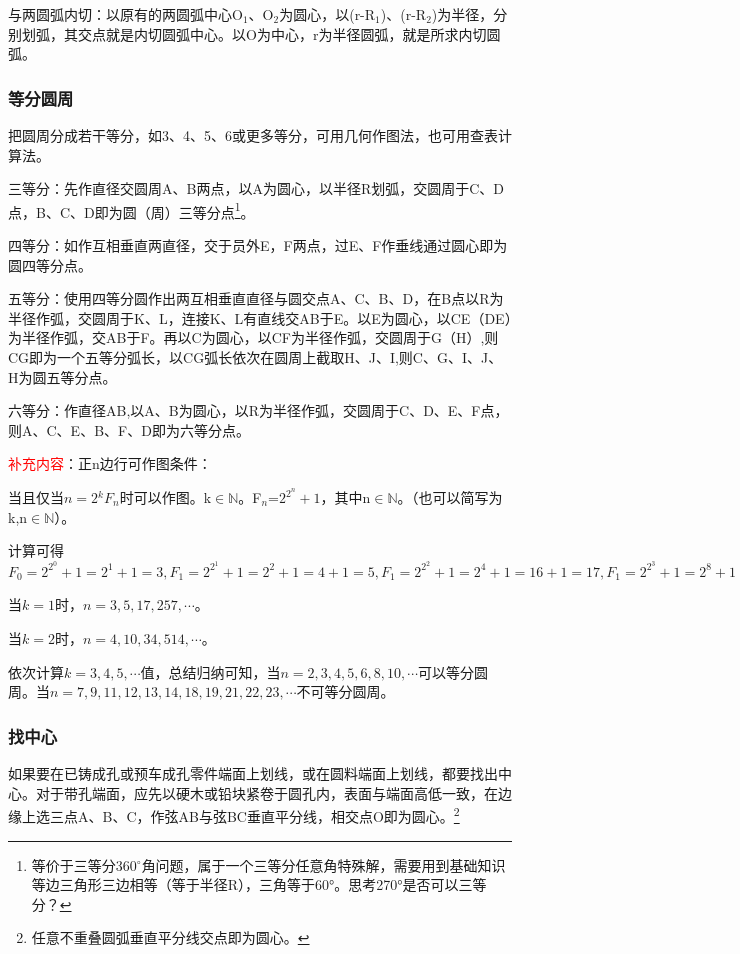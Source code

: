 \documentclass{ctexbook}
\begin{document}
与两圆弧内切：以原有的两圆弧中心O$_1$、O$_{2}$为圆心，以(r-R$_1$)、(r-R$_2$)为半径，分别划弧，其交点就是内切圆弧中心。以O为中心，r为半径圆弧，就是所求内切圆弧。
\subsubsection{等分圆周}
把圆周分成若干等分，如3、4、5、6或更多等分，可用几何作图法，也可用查表计算法。

三等分：先作直径交圆周A、B两点，以A为圆心，以半径R划弧，交圆周于C、D点，B、C、D即为圆（周）三等分点\footnote{等价于三等分360$^{\circ}$角问题，属于一个三等分任意角特殊解，需要用到基础知识等边三角形三边相等（等于半径R），三角等于60°。思考270°是否可以三等分？}。

四等分：如作互相垂直两直径，交于员外E，F两点，过E、F作垂线通过圆心即为圆四等分点。

五等分：使用四等分圆作出两互相垂直直径与圆交点A、C、B、D，在B点以R为半径作弧，交圆周于K、L，连接K、L有直线交AB于E。以E为圆心，以CE（DE）为半径作弧，交AB于F。再以C为圆心，以CF为半径作弧，交圆周于G（H）,则CG即为一个五等分弧长，以CG弧长依次在圆周上截取H、J、I,则C、G、I、J、H为圆五等分点。

六等分：作直径AB,以A、B为圆心，以R为半径作弧，交圆周于C、D、E、F点，则A、C、E、B、F、D即为六等分点。

\textcolor{red}{\mbox{补充内容}}：正n边行可作图条件：

当且仅当$n=2{^k}F_{n}$时可以作图。k$\in \mathbb {N}$。F$_n$=$2^{2^{n}}+1$，其中n$\in \mathbb {N}$。（也可以简写为k,n$\in \mathbb{N}$）。

计算可得$F_{0}=2^{2^{0}}+1=2^1+1=3,F_{1}=2^{2^{1}}+1=2^{2}+1=4+1=5,F_{1}=2^{2^{2}}+1=2^{4}+1=16+1=17,F_{1}=2^{2^{3}}+1=2^{8}+1=256+1=257,F_{1}=2^{2^{4}}+1=2^{16}+1=65536+1=65537,\cdots$

当$k=1$时，$n=3,5,17,257,\cdots$。

当$k=2$时，$n=4,10,34,514,\cdots$。

依次计算$k=3,4,5,\cdots$值，总结归纳可知，当$n=2,3,4,5,6,8,10,\cdots$可以等分圆周。当$n=7,9,11,12,13,14,18,19,21,22,23,\cdots$不可等分圆周。
\subsubsection{找中心}
如果要在已铸成孔或预车成孔零件端面上划线，或在圆料端面上划线，都要找出中心。对于带孔端面，应先以硬木或铅块紧卷于圆孔内，表面与端面高低一致，在边缘上选三点A、B、C，作弦AB与弦BC垂直平分线，相交点O即为圆心。\footnote{任意不重叠圆弧垂直平分线交点即为圆心。}
\end{document}
